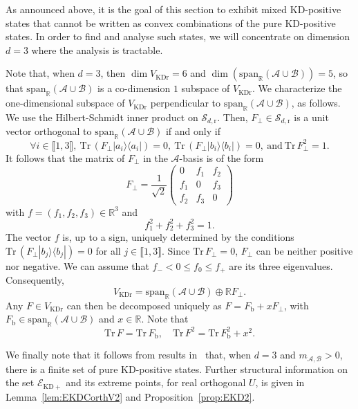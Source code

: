 \documentclass[a4paper, notitlepage, 11pt]{article}
\numberwithin{equation}{section}
\newcommand{\bra}[1]{\langle #1|}
\newcommand{\cket}[1]{|#1\rangle}
\newcommand{\Acal}{{\mathcal A}}
\newcommand{\Bcal}{{\mathcal B}}
\newcommand{\EcalKDC}{{\mathcal E}_{\mathrm{KD+}}}
\newcommand{\spanRAB}{{\mathrm{span}_{\R}(\Acal\cup\Bcal)}}
\newcommand{\R}{\mathbb{R}}
\newcommand{\mab}{m_{\Acal,\Bcal}}
\newcommand{\Tr}{\mathrm{Tr}\,}
\newcommand{\VR}{V_{\mathrm{KDr}}}
\newcommand{\SAOr}{\mathcal{S}_{d,\mathrm r}}
\newcommand{\IntEnt}[2]{\llbracket #1 , #2 \rrbracket}
\begin{document}
As announced above, it is the goal of this section to exhibit mixed KD-positive states that cannot be written as convex combinations of the pure KD-positive states. In order to find and analyse such states, we will concentrate on dimension $d=3$ where the analysis is tractable. 

Note that, when $d=3$, then  $\dim \VR=6$ and $\dim (\spanRAB)=5$, so that
$\spanRAB$ is a co-dimension $1$ subspace of $\VR$. We characterize the one-dimensional subspace of $\VR$ perpendicular to $\spanRAB$, as follows. We use the Hilbert-Schmidt inner product on $\SAOr$. Then, $F_\perp\in \SAOr$ is a unit vector orthogonal to $\spanRAB$ if and only if
$$
\forall i\in\IntEnt{1}{3}, \ \Tr(F_\perp\cket{a_i}\bra{a_i})=0, \ \Tr(F_\perp\cket{b_i}\bra{b_i})=0, \ \mathrm{ and } \  \Tr F^2_\perp=1.
$$
It follows that the matrix of $F_\perp$ in the $\Acal$-basis is of the form
\begin{equation}\label{def:F_perp}
F_\perp=\frac1{\sqrt2}
\begin{pmatrix}
0& f_1& f_2\\
f_1&0&f_3\\
f_2&f_3&0
\end{pmatrix}
\end{equation}
with $f=(f_1, f_2, f_3)\in\R^3$ and 
$$
f_1^2+f_2^2+f_3^2=1.
$$
The vector $f$ is, up to a sign, uniquely determined by the conditions $\Tr(F_\perp|b_j\rangle\langle b_j|)=0$ for all $j\in\IntEnt{1}{3}$. 
Since $\Tr F_\perp=0$, $F_\perp$ can  be neither positive nor negative. We can assume that $f_-<0 \leq f_0\leq f_+$ are its three eigenvalues.
Consequently,
\begin{equation}
\VR=\spanRAB\oplus \R F_\perp.
\end{equation}
Any $F\in\VR$ can then be decomposed uniquely as $F=F_{\mathrm{b}}+xF_\perp$, with $F_{\mathrm{b}}\in\spanRAB$ and $x\in\R$. Note that
\begin{equation}\label{eq:purity}
\Tr F=\Tr F_{\mathrm{b}}, \quad \Tr F^2=\Tr F_{\mathrm{b}}^2 +x^2.
\end{equation}

We finally note that it follows from results in~\cite{debievre2023a}  that, when $d=3$ and $\mab>0$, there is a finite set of pure KD-positive  states. Further structural information on the set $\EcalKDC$ and its extreme points, for real orthogonal $U$, is given in Lemma~\ref{lem:EKDCorthV2} and Proposition~\ref{prop:EKD2}. 
\end{document}
